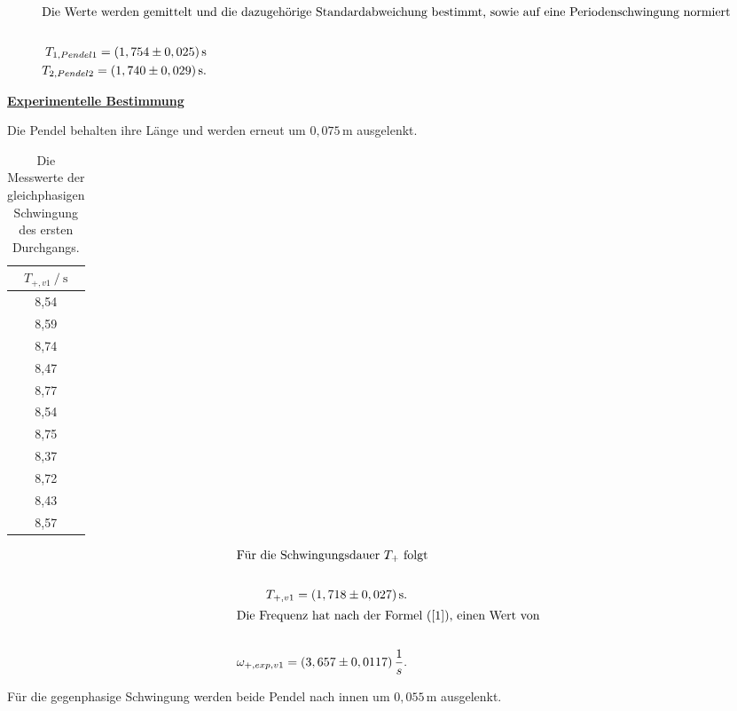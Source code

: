 \begin{align*}
    \intertext{Die Werte werden gemittelt und die dazugehörige Standardabweichung bestimmt, sowie auf eine Periodenschwingung normiert }\\
    T_{1,Pendel 1} = (1,754 \pm 0,025)\, \unit{\second}\\
    T_{2,Pendel 2} = (1,740 \pm 0,029)\, \unit{\second}.
\end{align*}

\underline{\textbf{Experimentelle Bestimmung}}

\begin{flushleft}
    Die Pendel behalten ihre Länge und werden erneut um $ 0,075\, \unit{\meter} $ ausgelenkt.
\end{flushleft}

\begin{table}[H]
    \centering
    \caption{Die Messwerte der gleichphasigen Schwingung des ersten Durchgangs.}
    \label{Tabelle2}
    \begin{tabular} {c}
        \toprule
        {$ T_{+,v1 } \mathbin{/} \unit{\second} $} \\
        \midrule
         8,54 \\
         8,59 \\
         8,74 \\
         8,47 \\
         8,77 \\
         8,54 \\
         8,75 \\
         8,37 \\
         8,72 \\
         8,43 \\
         8,57 \\
        \bottomrule
    \end{tabular} 
\end{table}

\begin{align*}
    \intertext{Für die Schwingungsdauer $T_{+}$ folgt}\\
    T_{+,v1} = (1,718 \pm 0,027)\, \unit{\second}.\\
    \intertext{Die Frequenz hat nach der Formel (\ref{1}), einen Wert von}\\
    \omega_{+,exp,v1} = (3,657 \pm 0,0117)\, \frac{1}{s}.
\end{align*}

\begin{flushleft}
    Für die gegenphasige Schwingung werden beide Pendel nach innen um $ 0,055\, \unit{\meter} $ ausgelenkt.
\end{flushleft}

